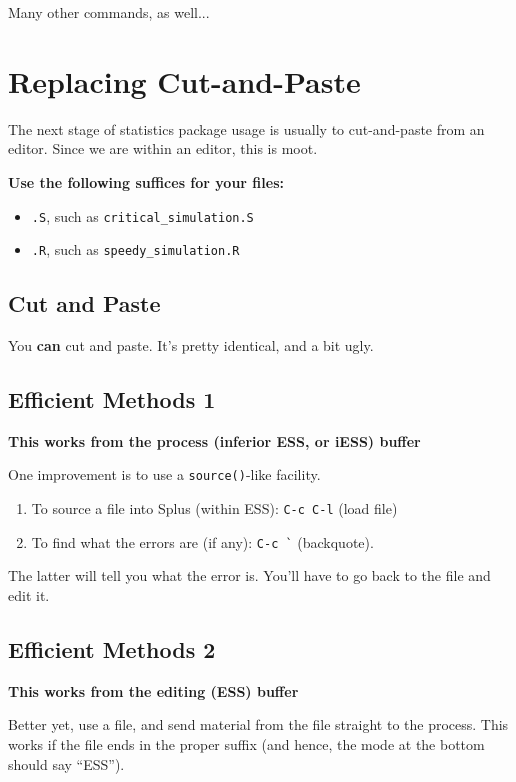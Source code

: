 \documentclass{article}
\begin{document}
Many other commands, as well...

\section{Replacing Cut-and-Paste}
\label{sec:cutpaste}

The next stage of statistics package usage is usually to cut-and-paste
from an editor.  Since we are within an editor, this is moot.

\textbf{Use the following suffices for your files:}
\begin{itemize}
\item \verb+.S+, such as \verb+critical_simulation.S+
\item \verb+.R+, such as \verb+speedy_simulation.R+
\end{itemize}

\subsection{Cut and Paste}
\label{sec:cutpaste:usual}

You \textbf{can} cut and paste.  It's pretty identical, and a bit ugly.

\subsection{Efficient Methods 1}
\label{sec:cutpaste:eff1}

\textbf{This works from the process (inferior ESS, or iESS) buffer}

One improvement is to use a \verb+source()+-like facility.

\begin{enumerate}
\item To source a file into Splus (within ESS): \verb+C-c C-l+  (load file)
\item To find what the errors are (if any): \verb+C-c `+ (backquote).
\end{enumerate}

The latter will tell you what the error is.  You'll have to go back to
the file and edit it.

\subsection{Efficient Methods 2}
\label{sec:cutpaste:eff2}

\textbf{This works from the editing (ESS) buffer}

Better yet, use a file, and send material from the file straight to
the process.  This works if the file ends in the proper suffix (and
hence, the mode at the bottom should say ``ESS'').
\end{document}
